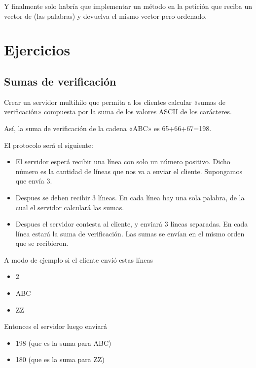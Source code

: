 \documentclass[letterpaper,10pt,spanish]{sphinxmanual}
\begin{document}
Y finalmente solo habría que implementar un método en la petición que reciba un vector de  (las palabras) y devuelva el mismo vector pero ordenado.


\section{Ejercicios}
\label{\detokenize{textos/tema3:ejercicios}}

\subsection{Sumas de verificación}
\label{\detokenize{textos/tema3:sumas-de-verificacion}}
Crear un servidor multihilo que permita a los clientes calcular «sumas de verificación» compuesta por la suma de los valores ASCII de los carácteres.

Así, la suma de verificación de la cadena «ABC» es 65+66+67=198.

El protocolo será el siguiente:
\begin{itemize}
\item {} 
El servidor esperá recibir una línea con solo un número positivo. Dicho número es la cantidad de líneas que nos va a enviar el cliente. Supongamos que envía 3.

\item {} 
Despues se deben recibir 3 líneas. En cada línea hay una sola palabra, de la cual el servidor calculará las sumas.

\item {} 
Despues el servidor contesta al cliente, y enviará 3 líneas separadas. En cada línea estará la suma de verificación. Las sumas se envían en el mismo orden que se recibieron.

\end{itemize}

A modo de ejemplo si el cliente envió estas líneas
\begin{itemize}
\item {} 
2

\item {} 
ABC

\item {} 
ZZ

\end{itemize}

Entonces el servidor luego enviará
\begin{itemize}
\item {} 
198 (que es la suma para ABC)

\item {} 
180 (que es la suma para ZZ)

\end{itemize}
\end{document}
